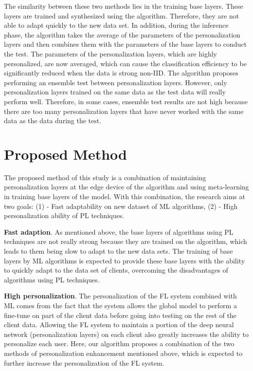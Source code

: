 \documentclass[runningheads]{llncs}
\begin{document}
The similarity between these two methods lies in the training base layers. These layers are trained and synthesized using the  algorithm. Therefore, they are not able to adapt quickly to the new data set. In addition, during the inference phase, the  algorithm takes the average of the parameters of the personalization layers and then combines them with the parameters of the base layers to conduct the test. The parameters of the personalization layers, which are highly personalized, are now averaged, which can cause the classification efficiency to be significantly reduced when the data is strong non-IID. The algorithm  proposes performing an ensemble test between personalization layers. However, only personalization layers trained on the same data as the test data will really perform well. Therefore, in some cases, ensemble test results are not high because there are too many personalization layers that have never worked with the same data as the data during the test.

\section{Proposed Method}

The proposed method of this study is a combination of maintaining personalization layers at the edge device of the algorithm  and using meta-learning in training base layers of the model. With this combination, the research aims at two goals: (1) - Fast adaptability on new dataset of ML algorithms, (2) - High personalization ability of PL techniques.

\textbf{Fast adaption}. As mentioned above, the base layers of algorithms using PL techniques are not really strong because they are trained on the  algorithm, which leads to them being slow to adapt to the new data sets. The training of base layers by ML algorithms is expected to provide these base layers with the ability to quickly adapt to the data set of clients, overcoming the disadvantages of algorithms using PL techniques.

\textbf{High personalization}. The personalization of the FL system combined with ML comes from the fact that the system allows the global model to perform a fine-tune on part of the client data before going into testing on the rest of the client data. Allowing the FL system to maintain a portion of the deep neural network (personalization layers) on each client also greatly increases the ability to personalize each user. Here, our algorithm proposes a combination of the two methods of personalization enhancement mentioned above, which is expected to further increase the personalization of the FL system.
\end{document}

